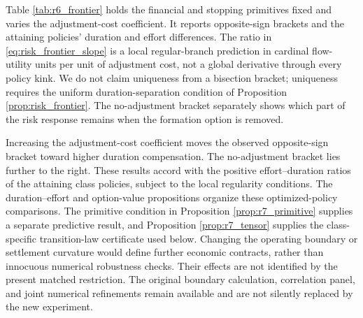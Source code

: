 Table \ref{tab:r6_frontier} holds the financial and stopping primitives fixed and varies the adjustment-cost coefficient. It reports opposite-sign brackets and the attaining policies' duration and effort differences. The ratio in \eqref{eq:risk_frontier_slope} is a local regular-branch prediction in cardinal flow-utility units per unit of adjustment cost, not a global derivative through every policy kink. We do not claim uniqueness from a bisection bracket; uniqueness requires the uniform duration-separation condition of Proposition \ref{prop:risk_frontier}. The no-adjustment bracket separately shows which part of the risk response remains when the formation option is removed.

Increasing the adjustment-cost coefficient moves the observed opposite-sign bracket toward higher duration compensation. The no-adjustment bracket lies further to the right. These results accord with the positive effort--duration ratios of the attaining class policies, subject to the local regularity conditions. The duration--effort and option-value propositions organize these optimized-policy comparisons. The primitive condition in Proposition \ref{prop:r7_primitive} supplies a separate predictive result, and Proposition \ref{prop:r7_tensor} supplies the class-specific transition-law certificate used below. Changing the operating boundary or settlement curvature would define further economic contracts, rather than innocuous numerical robustness checks. Their effects are not identified by the present matched restriction. The original boundary calculation, correlation panel, and joint numerical refinements remain available and are not silently replaced by the new experiment.
